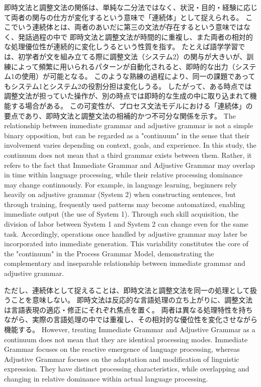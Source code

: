 \documentclass[a4paper]{article}
\begin{document}
\ifJPN
即時文法と調整文法の関係は、単純な二分法ではなく、状況・目的・経験に応じて両者の関与の仕方が変化するという意味で「連続体」として捉えられる。  
ここでいう連続体とは、両者のあいだに第三の文法が存在するという意味ではなく、発話過程の中で
即時文法と調整文法が時間的に重複し、また両者の相対的な処理優位性が連続的に変化しうるという性質を指す。
たとえば語学学習では、初学者が文を組み立てる際に調整文法（システム2）の関与が大きいが、訓練によって頻繁に用いられるパターンが自動化されると、即時的な出力（システム1の使用）が可能となる。  
このような熟練の過程により、同一の課題であってもシステム1とシステム2の役割分担は変化しうる。  
したがって、ある時点では調整文法が担っていた操作が、別の時点では即時的な生成の中に取り込まれて機能する場合がある。  
この可変性が、プロセス文法モデルにおける「連続体」の要点であり、即時文法と調整文法の相補的かつ不可分な関係を示す。  
\else
The relationship between immediate grammar and adjustive grammar is not a simple binary opposition, but can be regarded as a "continuum" in the sense that their involvement varies depending on context, goals, and experience.
In this study, the continuum does not mean that a third grammar exists between them. 
Rather, it refers to the fact that Immediate Grammar and Adjustive Grammar
may overlap in time within language processing,
while their relative processing dominance may change continuously.
For example, in language learning, beginners rely heavily on adjustive grammar (System 2) when constructing sentences, but through training, frequently used patterns may become automatized, enabling immediate output (the use of System 1).
Through such skill acquisition, the division of labor between System 1 and System 2 can change even for the same task.
Accordingly, operations once handled by adjustive grammar may later be incorporated into immediate generation.
This variability constitutes the core of the "continuum" in the Process Grammar Model, demonstrating the complementary and inseparable relationship between immediate grammar and adjustive grammar.
\fi

\ifJPN
ただし、連続体として捉えることは、即時文法と調整文法を同一の処理として扱うことを意味しない。
即時文法は反応的な言語処理の立ち上がりに、調整文法は言語表現の適応・修正にそれぞれ焦点を置く。
両者は異なる処理特性を持ちながら、実際の言語処理の中では重複し、その相対的な優位性を変化させながら機能する。
\else
However, treating Immediate Grammar and Adjustive Grammar as a continuum
does not mean that they are identical processing modes.
Immediate Grammar focuses on the reactive emergence of language processing,
whereas Adjustive Grammar focuses on the adaptation and modification of linguistic expression.
They have distinct processing characteristics, while overlapping and changing in relative dominance
within actual language processing.
\fi
\end{document}

